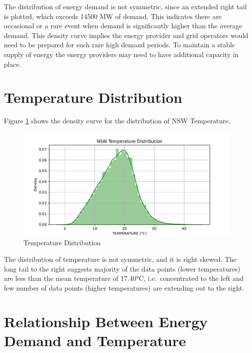 \documentclass[mstat,12pt]{unswthesis}
\begin{document}
The distribution of energy demand is not symmetric, since an extended
right tail is plotted, which exceeds 14500 MW of demand. This indicates
there are occasional or a rare event when demand is significantly higher
than the average demand. This density curve implies the energy provider
and grid operators would need to be prepared for such rare high demand
periods. To maintain a stable supply of energy the energy providers may
need to have additional capacity in place.

\hypertarget{temperature-distribution}{%
\section{Temperature Distribution}\label{temperature-distribution}}

Figure \ref{fig:plot-temp-distribution} shows the density curve for the
distribution of NSW Temperature.

\begin{figure}[H]
\includegraphics[width=1\linewidth,]{ZZSC9020_Group_Report_files/figure-latex/plot-temp-distribution-3} \caption{Temperature Distribution}\label{fig:plot-temp-distribution}
\end{figure}

The distribution of temperature is not symmetric, and it is right
skewed. The long tail to the right suggests majority of the data points
(lower temperatures) are less than the mean temperature of 17.40°C,
i.e.~concentrated to the left and few number of data points (higher
temperatures) are extending out to the right.

\hypertarget{relationship-between-energy-demand-and-temperature}{%
\section{Relationship Between Energy Demand and
Temperature}\label{relationship-between-energy-demand-and-temperature}}
\end{document}
